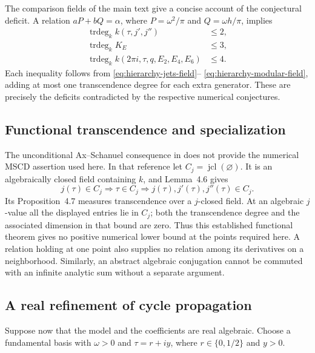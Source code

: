 The comparison fields of the main text give a concise account of the
conjectural deficit.  A relation $aP+bQ=\alpha$, where
$P=\omega^2/\pi$ and $Q=\omega h/\pi$, implies
\[
 \begin{aligned}
 \operatorname{trdeg}_k k(\tau,j',j'')&\le2,\\
 \operatorname{trdeg}_k K_E&\le3,\\
 \operatorname{trdeg}_k k(2\pi i,\tau,q,E_2,E_4,E_6)&\le4.
 \end{aligned}
\]
Each inequality follows from \eqref{eq:hierarchy-jets-field}--
\eqref{eq:hierarchy-modular-field}, adding at most one transcendence
degree for each extra generator.  These are precisely the deficits
contradicted by the respective numerical conjectures.

\subsection{Functional transcendence and specialization}
The unconditional Ax--Schanuel consequence in
\cite[Section~4.1]{EterovicMSCD} does not provide the numerical
MSCD assertion used here.  In that reference let
$C_j=\operatorname{jcl}(\varnothing)$.  It is an algebraically closed
field containing $k$, and Lemma~4.6 gives
\[
 j(\tau)\in C_j\Longrightarrow\tau\in C_j
 \Longrightarrow j(\tau),j'(\tau),j''(\tau)\in C_j.
\]
Its Proposition~4.7 measures transcendence over a $j$-closed field.
At an algebraic $j$-value all the displayed entries lie in $C_j$;
both the transcendence degree and the associated dimension in that
bound are zero.  Thus this established functional theorem gives no
positive numerical lower bound at the points required here.
A relation holding at one point also supplies no relation among its
derivatives on a neighborhood.  Similarly, an abstract algebraic
conjugation cannot be commuted with an infinite analytic sum without
a separate argument.

\subsection{A real refinement of cycle propagation}\label{sec:real-propagation}
Suppose now that the model and the coefficients are real algebraic.
Choose a fundamental basis with $\omega>0$ and
$\tau=r+iy$, where $r\in\{0,1/2\}$ and $y>0$.


